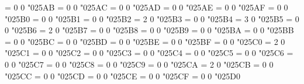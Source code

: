 \Umathchardef\smwhtsquare = 0 0 "025AB %
\Umathchardef\hrectangleblack = 0 0 "025AC %
\Umathchardef\hrectangle = 0 0 "025AD %
\Umathchardef\vrectangleblack = 0 0 "025AE %
\Umathchardef\vrectangle = 0 0 "025AF %
\Umathchardef\parallelogramblack = 0 0 "025B0 %
\Umathchardef\parallelogram = 0 0 "025B1 %
\Umathchardef\bigblacktriangleup = 0 0 "025B2 %
\Umathchardef\bigtriangleup = 2 0 "025B3 %
\Umathchardef\blacktriangle = 0 0 "025B4 %
\Umathchardef\vartriangle = 3 0 "025B5 %
\Umathchardef\blacktriangleright = 0 0 "025B6 %
\Umathchardef\triangleright = 2 0 "025B7 %
\Umathchardef\smallblacktriangleright = 0 0 "025B8 %
\Umathchardef\smalltriangleright = 0 0 "025B9 %
\Umathchardef\blackpointerright = 0 0 "025BA %
\Umathchardef\whitepointerright = 0 0 "025BB %
\Umathchardef\bigblacktriangledown = 0 0 "025BC %
\Umathchardef\bigtriangledown = 0 0 "025BD %
\Umathchardef\blacktriangledown = 0 0 "025BE %
\Umathchardef\triangledown = 0 0 "025BF %
\Umathchardef\blacktriangleleft = 0 0 "025C0 %
\Umathchardef\triangleleft = 2 0 "025C1 %
\Umathchardef\smallblacktriangleleft = 0 0 "025C2 %
\Umathchardef\smalltriangleleft = 0 0 "025C3 %
\Umathchardef\blackpointerleft = 0 0 "025C4 %
\Umathchardef\whitepointerleft = 0 0 "025C5 %
\Umathchardef\mdlgblkdiamond = 0 0 "025C6 %
\Umathchardef\mdlgwhtdiamond = 0 0 "025C7 %
\Umathchardef\blackinwhitediamond = 0 0 "025C8 %
\Umathchardef\fisheye = 0 0 "025C9 %
\Umathchardef\mdlgwhtlozenge = 0 0 "025CA %
\Umathchardef\mdlgwhtcircle = 2 0 "025CB %
\Umathchardef\dottedcircle = 0 0 "025CC %
\Umathchardef\circlevertfill = 0 0 "025CD %
\Umathchardef\bullseye = 0 0 "025CE %
\Umathchardef\mdlgblkcircle = 0 0 "025CF %
\Umathchardef\circlelefthalfblack = 0 0 "025D0 %
